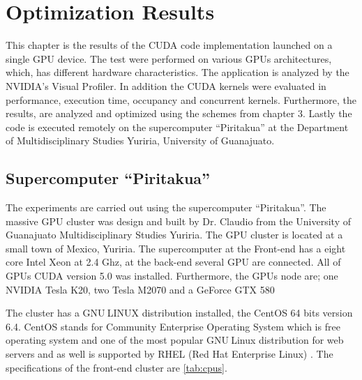 
\chapter{Optimization Results} %

\label{Optimization Results} %



This chapter is the results of the CUDA code implementation launched on a single GPU device. The test were performed on various GPUs architectures, which, has different hardware characteristics. The application is analyzed by the NVIDIA's Visual Profiler. In addition the CUDA kernels were evaluated in performance, execution time, occupancy and concurrent kernels. Furthermore, the results, are analyzed and optimized using the schemes from chapter 3. Lastly the code is executed remotely on the supercomputer ``Piritakua'' at the Department of Multidisciplinary Studies Yuriria, University of Guanajuato.

\section{Supercomputer ``Piritakua''}

The experiments are carried out using the supercomputer “Piritakua”. The massive GPU cluster was design and built by Dr. Claudio from the University of Guanajuato Multidisciplinary Studies Yuriria. The GPU cluster is located at a small town of Mexico, Yuriria. The supercomputer at the Front-end has a eight core Intel Xeon at 2.4 Ghz, at the back-end several GPU are connected. All of GPUs CUDA version 5.0 was installed. Furthermore, the GPUs node are; one NVIDIA Tesla K20, two Tesla M2070 and a GeForce GTX 580 

The cluster has a GNU$ \ $LINUX distribution installed, the CentOS 64 bits version 6.4. CentOS stands for Community Enterprise Operating System which is free operating system and one of the most popular GNU$ \ $Linux distribution for web servers and as well is supported by RHEL (Red Hat Enterprise Linux) \cite{centos}. The specifications of the front-end cluster are \ref{tab:cpus}.

